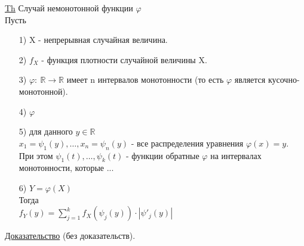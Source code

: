 \underline{Th} Случай немонотонной функции $\varphi$ \\
Пусть
\begin{enumerate}
	\item[1)] X - непрерывная случайная величина.
	\item[2)] $f_X$ - функция плотности случайной величины X.
	\item[3)] $\varphi: \ \mathbb{R} \to \mathbb{R}$ имеет n интервалов монотонности (то есть $\varphi$ является кусочно-монотонной).
	\item[4)] $\varphi$
	\item[5)] для данного $y \in \mathbb{R}$ \\
	$x_1 = \psi_1(y), \ldots, x_n = \psi_n(y)$ - все распределения уравнения $\varphi(x) = y$. \\
	При этом $\psi_1(t), \ldots, \psi_k(t)$ - функции обратные $\varphi$ на интервалах монотонности, которые ...
	\item[6)] $Y = \varphi(X)$ \\
	Тогда \\
	$f_Y(y) = \sum\limits_{j = 1}^{k} f_X \left(\psi_j(y)\right) \cdot \left|\psi'_j(y)\right|$
\end{enumerate}


\underline{Доказательство} (без доказательств).
























